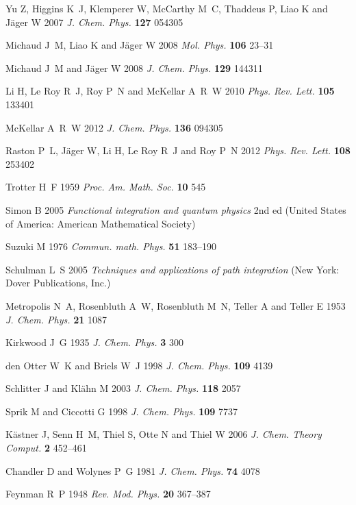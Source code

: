 \documentclass[12pt]{iopart}
\begin{document}
\begin{thebibliography}{100}
Yu Z, Higgins K~J, Klemperer W, McCarthy M~C, Thaddeus P, Liao K and J{\"a}ger
  W 2007 {\em J. Chem. Phys.\/} {\bf 127} 054305

Michaud J~M, Liao K and J{\"a}ger W 2008 {\em Mol. Phys.\/} {\bf 106} 23--31

Michaud J~M and J{\"a}ger W 2008 {\em J. Chem. Phys.\/} {\bf 129} 144311

Li H, {Le Roy} R~J, Roy P~N and McKellar A~R~W 2010 {\em Phys. Rev. Lett.\/}
  {\bf 105} 133401

McKellar A~R~W 2012 {\em J. Chem. Phys.\/} {\bf 136} 094305

Raston P~L, J{\"a}ger W, Li H, {Le Roy} R~J and Roy P~N 2012 {\em Phys. Rev.
  Lett.\/} {\bf 108} 253402

Trotter H~F 1959 {\em Proc. Am. Math. Soc.\/} {\bf 10} 545

Simon B 2005 {\em Functional integration and quantum physics\/} 2nd ed (United
  States of America: American Mathematical Society)

Suzuki M 1976 {\em Commun. math. Phys.\/} {\bf 51} 183--190

Schulman L~S 2005 {\em Techniques and applications of path integration\/} (New
  York: Dover Publications, Inc.)

Metropolis N~A, Rosenbluth A~W, Rosenbluth M~N, Teller A and Teller E 1953 {\em
  J. Chem. Phys.\/} {\bf 21} 1087

Kirkwood J~G 1935 {\em J. Chem. Phys.\/} {\bf 3} 300

{den Otter} W~K and Briels W~J 1998 {\em J. Chem. Phys.\/} {\bf 109} 4139

Schlitter J and Kl{\"a}hn M 2003 {\em J. Chem. Phys.\/} {\bf 118} 2057

Sprik M and Ciccotti G 1998 {\em J. Chem. Phys.\/} {\bf 109} 7737

K{\"a}stner J, Senn H~M, Thiel S, Otte N and Thiel W 2006 {\em J. Chem. Theory
  Comput.\/} {\bf 2} 452--461

Chandler D and Wolynes P~G 1981 {\em J. Chem. Phys.\/} {\bf 74} 4078

Feynman R~P 1948 {\em Rev. Mod. Phys.\/} {\bf 20} 367--387


\end{thebibliography}
\end{document}
